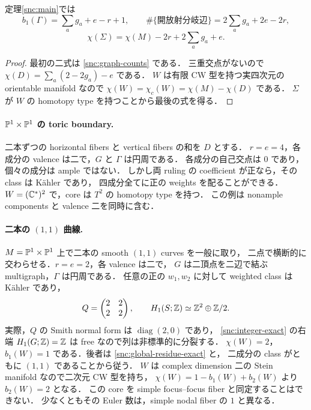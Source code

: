 \begin{corollary}
\label{snc:counts}
定理\ref{snc:main}では
\[
 b_1(\Gamma)=\sum_a g_a+e-r+1,\qquad
 \#\{\text{開放射分岐辺}\}=2\sum_a g_a+2e-2r,
\]
\[
 \chi(\Sigma)=\chi(M)-2r+2\sum_a g_a+e.
\]
\end{corollary}
\begin{proof}
最初の二式は \eqref{snc:graph-counts} である．
三重交点がないので $\chi(D)=\sum_a(2-2g_a)-e$ である．
$W$ は有限 CW 型を持つ実四次元の orientable manifold なので
$\chi(W)=\chi_c(W)=\chi(M)-\chi(D)$ である．
$\Sigma$ が $W$ の homotopy type を持つことから最後の式を得る．
\end{proof}

\paragraph{$\mathbb P^1\times\mathbb P^1$ の toric boundary.}
二本ずつの horizontal fibers と vertical fibers の和を $D$ とする．
$r=e=4$，各成分の valence は二で，$G$ と $\Gamma$ は円周である．
各成分の自己交点は $0$ であり，個々の成分は ample ではない．
しかし両 ruling の coefficient が正なら，その class は Kähler であり，
四成分全てに正の weights を配ることができる．
$W=(\mathbb C^*)^2$ で，core は $T^2$ の homotopy type を持つ．
この例は nonample components と valence 二を同時に含む．

\paragraph{二本の $(1,1)$ 曲線.}
$M=\mathbb P^1\times\mathbb P^1$ 上で二本の smooth $(1,1)$ curves を一般に取り，
二点で横断的に交わらせる．$r=e=2$，各 valence は二で，
$G$ は二頂点を二辺で結ぶ multigraph，$\Gamma$ は円周である．
任意の正の $w_1,w_2$ に対して weighted class は Kähler であり，
\[
 Q=\begin{pmatrix}2&2\\2&2\end{pmatrix},\qquad
 H_1(S;\mathbb Z)\simeq\mathbb Z^2\oplus\mathbb Z/2.
\]
実際，$Q$ の Smith normal form は $\operatorname{diag}(2,0)$ であり，
\eqref{snc:integer-exact} の右端 $H_1(G;\mathbb Z)=\mathbb Z$ は free なので列は非標準的に分裂する．
$\chi(W)=2$，$b_1(W)=1$ である．後者は \eqref{snc:global-residue-exact} と，
二成分の class がともに $(1,1)$ であることから従う．
$W$ は complex dimension 二の Stein manifold なので二次元 CW 型を持ち，
$\chi(W)=1-b_1(W)+b_2(W)$ より $b_2(W)=2$ となる．
この core を simple focus--focus fiber と同定することはできない．
少なくともその Euler 数は，simple nodal fiber の $1$ と異なる．

